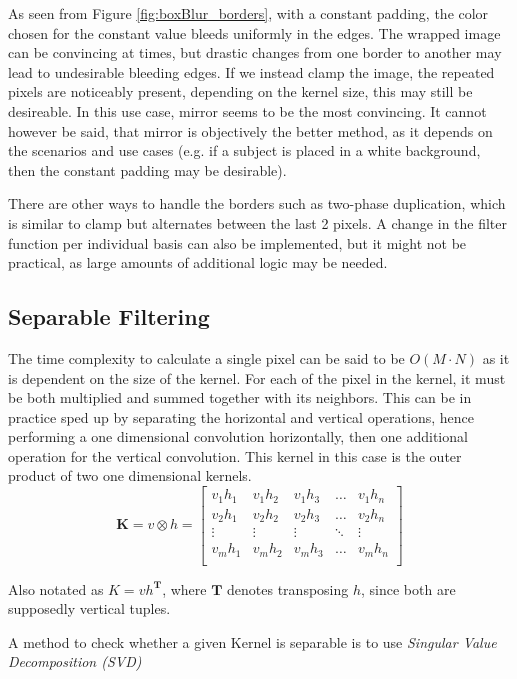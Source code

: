 \documentclass[twoside,a4paper,article]{combine}
\begin{document}
As seen from Figure \ref{fig:boxBlur_borders}, with a constant padding, the color chosen for the constant value bleeds uniformly in the edges. The wrapped image
can be convincing at times, but drastic changes from one border to another may lead to undesirable bleeding edges. If we instead clamp the image, the repeated pixels are noticeably
present, depending on the kernel size, this may still be desireable. In this use case, mirror seems to be the most convincing. It cannot however be said, that mirror is objectively the better
method, as it depends on the scenarios and use cases (e.g. if a subject is placed in a white background, then the constant padding may be desirable).

There are other ways to handle the borders such as two-phase duplication,
which is similar to clamp but alternates between the last 2 pixels.
A change in the filter function per individual basis can also be implemented, but it might not be practical,
as large amounts of additional logic may be needed\cite{BaileyAmbikumar18}.

\subsection{Separable Filtering}
The time complexity to calculate a single pixel can be said to be $O(M \cdot N)$ as it is dependent
on the size of the kernel. For each of the pixel in the kernel, it must be both multiplied and summed together
with its neighbors. This can be in practice sped up by separating the horizontal and vertical operations, hence performing
a one dimensional convolution horizontally, then one additional operation for the vertical convolution. This kernel in this case is the
outer product of two one dimensional kernels\cite{Szeliski_2022}. 
\[
    \boldsymbol{K} = v \otimes h = 
    \begin{bmatrix}
        v_1h_1 & v_1h_2 & v_1 h_3 & \hdots & v_1h_n \\
        v_2h_1 & v_2h_2 & v_2 h_3 & \hdots & v_2h_n \\
        \vdots & \vdots & \vdots & \ddots & \vdots \\
        v_m h_1 & v_m h_2 & v_m h_3 & \hdots & v_m h_n \\
    \end{bmatrix}
\]

Also notated as $K=vh^{\boldsymbol{T}}$, where $\boldsymbol{T}$ denotes transposing $h$, since both are supposedly vertical tuples.

A method to check whether a given Kernel is separable is to use \emph{Singular Value Decomposition (SVD)} \cite{Szeliski_2022}
\end{document}

